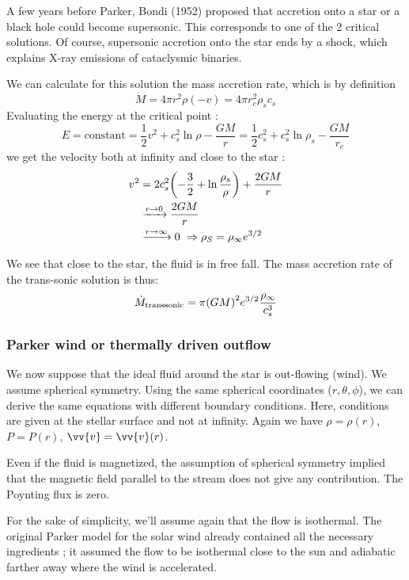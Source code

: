\documentclass[10pt,a4paper,english]{article}
\let\originalleft\left
\let\originalright\right
\renewcommand{\left}{\mathopen{}\mathclose\bgroup\originalleft}
\renewcommand{\right}{\aftergroup\egroup\originalright}
\begin{document}
A few years before Parker, Bondi (1952) proposed that accretion onto a star or a black hole could become supersonic. This corresponds to one of the 2 critical solutions. Of course, supersonic accretion onto the star ends by a shock, which explains X-ray emissions of cataclysmic binaries.

We can calculate for this solution the mass accretion rate, which is by definition
\begin{equation}
    \dot{M} = 4\pi r^2 \rho (-v) = 4\pi r_c^2 \rho_s c_s
\end{equation}
Evaluating the energy at the critical point :
\begin{equation}
    E = \textrm{constant} = \frac{1}{2}v^2 + c_s^2 \ln\rho - \frac{GM}{r} = \frac{1}{2}c_s^2 + c_s^2 \ln \rho_s - \frac{GM}{r_c}
\end{equation}
we get the velocity both at infinity and close to the star :
\begin{align}
    v^2 &= 2c_s^2 \left( -\frac{3}{2} + \ln \frac{\rho_s}{\rho} \right)  + \frac{2GM}{r} \\
        & \xrightarrow{r\to 0} \frac{2GM}{r} \\
        & \xrightarrow{r\to\infty} 0\ \Rightarrow \rho_S = \rho_\infty e^{3/2}
\end{align}

We see that close to the star, the fluid is in free fall. The mass accretion rate of the trans-sonic solution is thus:
\begin{equation}
    \dot{M}_\mathrm{transsonic} = \pi \left( GM \right)^2 e^{3/2} \frac{\rho_\infty}{c_s^3}
\end{equation}
\subsubsection{Parker wind or thermally driven outflow}
We now suppose that the ideal fluid around the star is out-flowing (wind). We assume spherical symmetry. Using the same spherical coordinates ($r, \theta, \phi$), we can derive the same equations with different boundary conditions. Here, conditions are given at the stellar surface and not at infinity. Again we have $\rho = \rho(r)$, $P = P(r)$, $\vv{v} = \vv{v}(r)$.

Even if the fluid is magnetized, the assumption of spherical symmetry implied that the magnetic field parallel to the stream does not give any contribution. The Poynting flux is zero.

For the sake of simplicity, we'll assume again that the flow is isothermal. The original Parker model for the solar wind already contained all the necessary ingredients ; it assumed the flow to be isothermal close to the sun and adiabatic farther away where the wind is accelerated.
\end{document}
